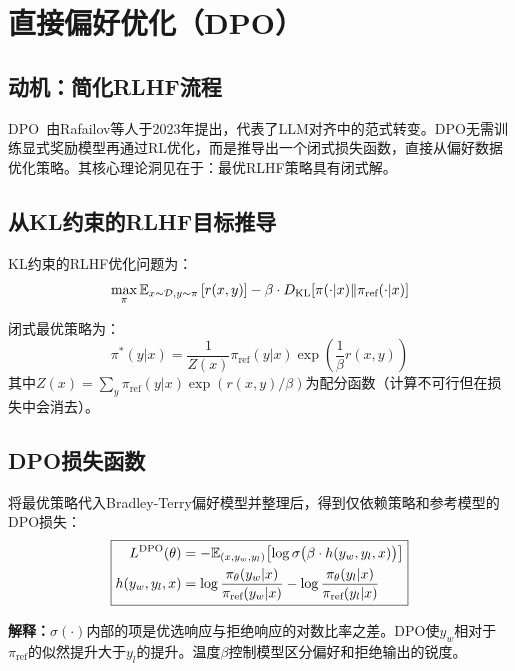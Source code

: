 \section{直接偏好优化（DPO）}
\label{sec:dpo}

\subsection{动机：简化RLHF流程}

DPO~\cite{rafailov2023dpo}由Rafailov等人于2023年提出，代表了LLM对齐中的范式转变。DPO无需训练显式奖励模型再通过RL优化，而是推导出一个闭式损失函数，直接从偏好数据优化策略。其核心理论洞见在于：最优RLHF策略具有闭式解。

\subsection{从KL约束的RLHF目标推导}

KL约束的RLHF优化问题为：
\begin{equation}
\max_\pi \mathbb{E}_{x \sim \mathcal{D}, y \sim \pi}\left[r(x,y)\right] - \beta \cdot D_{\text{KL}}\!\left[\pi(\cdot|x) \| \pi_{\text{ref}}(\cdot|x)\right]
\end{equation}

闭式最优策略为：
\begin{equation}
\pi^*(y|x) = \frac{1}{Z(x)}\pi_{\text{ref}}(y|x)\exp\!\left(\frac{1}{\beta}r(x,y)\right)
\end{equation}
其中$Z(x) = \sum_y \pi_{\text{ref}}(y|x)\exp(r(x,y)/\beta)$为配分函数（计算不可行但在损失中会消去）。

\subsection{DPO损失函数}

将最优策略代入Bradley-Terry偏好模型并整理后，得到仅依赖策略和参考模型的DPO损失：
\begin{equation}
\boxed{
\begin{aligned}
L^{\text{DPO}}(\theta) &= -\mathbb{E}_{(x,y_w,y_l)}\bigl[\log\sigma\bigl(\beta\cdot h(y_w,y_l,x)\bigr)\bigr] \\
h(y_w,y_l,x) &= \log\frac{\pi_\theta(y_w|x)}{\pi_{\text{ref}}(y_w|x)} - \log\frac{\pi_\theta(y_l|x)}{\pi_{\text{ref}}(y_l|x)}
\end{aligned}
}
\label{eq:dpo}
\end{equation}

\textbf{解释：}$\sigma(\cdot)$内部的项是优选响应与拒绝响应的对数比率之差。DPO使$y_w$相对于$\pi_{\text{ref}}$的似然提升大于$y_l$的提升。温度$\beta$控制模型区分偏好和拒绝输出的锐度。

